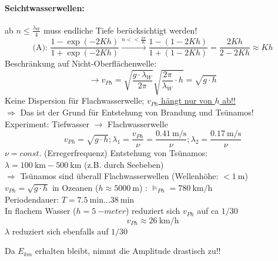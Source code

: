 \paragraph{Seichtwasserwellen:}
ab $  n \leq \frac{\lambda_W}{4} $ muss endliche Tiefe berücksichtigt werden!\\
$$\text{(A): } \frac{1-\exp(-2Kh)}{1+\exp(-2Kh)} \overset{n<<\frac{2\pi}{K}}{\longrightarrow} \frac{1-(1-2Kh)}{1+(1-2Kh)} = \frac{2Kh}{2-2Kh} \approx Kh$$
Beschränkung auf Nicht-Oberflächenwelle:\\
$$ \rightarrow v_{Ph} = \sqrt{\frac{g\cdot\lambda_W}{2\pi}} \sqrt{\frac{2\pi}{\lambda_W}\cdot h} = \sqrt{g \cdot h} $$
Keine Dispersion für Flachwasserwelle; \underline{$ v_{Ph}  $ hängt nur von $ h $ ab!!}\\
$ \Rightarrow $ Das ist der Grund für Entstehung von Brandung und Tsünamos!\\
Experiment: Tiefwasser $ \rightarrow $ Flachwasserwelle\\
\bild
$$ v_{Ph}  = \sqrt{g\cdot h}; \lambda_1 = \frac{v_{Ph}}{\nu} = \frac{\SI{0,41}{\meter\per\second}}{\nu}; \lambda_2 = \frac{\SI{0,17}{\meter\per\second}}{\nu} $$
$ \nu  = const.$ (Erregerfrequenz)
\bild
Entstehung von Tsünamos:\\
$ \lambda=\SI{100}{\kilo\meter} - \SI{500}{\kilo\meter} $ (z.B. durch Seebeben)\\
$ \Rightarrow $ Tsünamos sind überall Flachwasserwellen (Wellenhöhe: $ <\SI{1}{\meter} $)\\
$ v_{Ph} = \sqrt{g\cdot h} $ in Ozeanen ($ h \approx \SI{5000}{\meter} $) : $ \vDash_{Ph} =\SI{780}{\kilo\meter\per\hour} $\\
Periodendauer: $ T=\SI{7,5}{\minute} ... \SI{38}{\minute} $\\
In flachem Wasser ($ h=\SI{5}{-meter} $) reduziert sich $ v_{Ph}  $ auf ca $ 1/30 $
$$ v_{Ph}  \approx \SI{26}{\kilo\meter\per\hour}$$
$ \lambda $ reduziert sich ebenfalls auf $ 1/30 $
\begin{tcolorbox} [colback = {White}, outer arc=0mm, sharp corners]
	Da $ E_{km} $ erhalten bleibt, nimmt die Amplitude drastisch zu!!
\end{tcolorbox}
